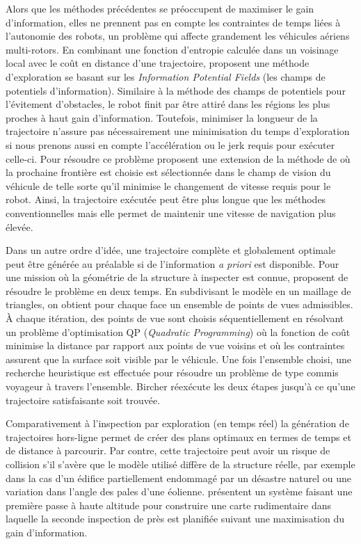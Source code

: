 Alors que les méthodes précédentes se préoccupent de maximiser le gain d'information, elles ne prennent pas en compte les contraintes de temps liées à l'autonomie des robots, un problème qui affecte grandement les véhicules aériens multi-rotors. En combinant une fonction d'entropie calculée dans un voisinage local avec le coût en distance d'une trajectoire, \citep{Wang2017} proposent une méthode d'exploration se basant sur les \textit{Information Potential Fields} (les champs de potentiels d'information). Similaire à la méthode des champs de potentiels pour l'évitement d'obstacles, le robot finit par être attiré dans les régions les plus proches à haut gain d'information. Toutefois, minimiser la longueur de la trajectoire n'assure pas nécessairement une minimisation du temps d'exploration si nous prenons aussi en compte l'accélération ou le jerk requis pour exécuter celle-ci. Pour résoudre ce problème \citep{Cieslewski2017} proposent une extension de la méthode de \citep{Yamauchi1997} où la prochaine frontière est choisie est sélectionnée dans le champ de vision du véhicule de telle sorte qu'il minimise le changement de vitesse requis pour le robot. Ainsi, la trajectoire exécutée peut être plus longue que les méthodes conventionnelles mais elle permet de maintenir une vitesse de navigation plus élevée.

Dans un autre ordre d'idée, une trajectoire complète et globalement optimale peut être générée au préalable si de l'information \textit{a priori} est disponible. Pour une mission où la géométrie de la structure à inspecter est connue, \citep{Bircher2015} proposent de résoudre le problème en deux temps. En subdivisant le modèle en un maillage de triangles, on obtient pour chaque face un ensemble de points de vues admissibles. À chaque itération, des points de vue sont choisis séquentiellement en résolvant un problème d'optimisation QP (\emph{Quadratic Programming}) où la fonction de coût minimise la distance par rapport aux points de vue voisins et où les contraintes assurent que la surface soit visible par le véhicule. Une fois l'ensemble choisi, une recherche heuristique est effectuée pour résoudre un problème de type commis voyageur à travers l'ensemble. Bircher réexécute les deux étapes jusqu'à ce qu'une trajectoire satisfaisante soit trouvée.

Comparativement à l'inspection par exploration (en temps réel) la génération de trajectoires hors-ligne permet de créer des plans optimaux en termes de temps et de distance à parcourir. Par contre, cette trajectoire peut avoir un risque de collision s'il s'avère que le modèle utilisé diffère de la structure réelle, par exemple dans la cas d'un édifice partiellement endommagé par un désastre naturel ou une variation dans l'angle des pales d'une éolienne. \citep{Hepp2017} présentent un système faisant une première passe à haute altitude pour construire une carte rudimentaire dans laquelle la seconde inspection de près est planifiée suivant une maximisation du gain d'information.

